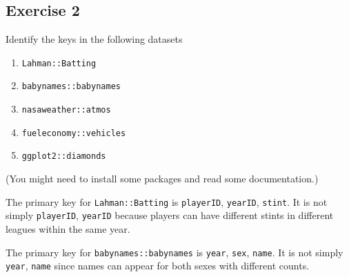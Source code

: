 \documentclass[]{book}
\newenvironment{Shaded}{\begin{snugshade}}{\end{snugshade}}
\newcommand{\CommentTok}[1]{\textcolor[rgb]{0.56,0.35,0.01}{\textit{#1}}}
\newcommand{\DecValTok}[1]{\textcolor[rgb]{0.00,0.00,0.81}{#1}}
\newcommand{\KeywordTok}[1]{\textcolor[rgb]{0.13,0.29,0.53}{\textbf{#1}}}
\newcommand{\NormalTok}[1]{#1}
\newcommand{\OperatorTok}[1]{\textcolor[rgb]{0.81,0.36,0.00}{\textbf{#1}}}
\newcommand{\StringTok}[1]{\textcolor[rgb]{0.31,0.60,0.02}{#1}}
\providecommand{\tightlist}{%
  \setlength{\itemsep}{0pt}\setlength{\parskip}{0pt}}
\theoremstyle{plain}
\theoremstyle{remark}
\theoremstyle{definition}
\theoremstyle{definition}
\theoremstyle{definition}
\theoremstyle{remark}
\begin{document}
\hypertarget{exercise-2-26}{%
\subsection{Exercise 2}\label{exercise-2-26}}

Identify the keys in the following datasets

\begin{enumerate}
\def\labelenumi{\arabic{enumi}.}
\tightlist
\item
  \texttt{Lahman::Batting}
\item
  \texttt{babynames::babynames}
\item
  \texttt{nasaweather::atmos}
\item
  \texttt{fueleconomy::vehicles}
\item
  \texttt{ggplot2::diamonds}
\end{enumerate}

(You might need to install some packages and read some documentation.)

The primary key for \texttt{Lahman::Batting} is \texttt{playerID},
\texttt{yearID}, \texttt{stint}. It is not simply \texttt{playerID},
\texttt{yearID} because players can have different stints in different
leagues within the same year.

\begin{Shaded}
\end{Shaded}

The primary key for \texttt{babynames::babynames} is \texttt{year},
\texttt{sex}, \texttt{name}. It is not simply \texttt{year},
\texttt{name} since names can appear for both sexes with different
counts.

\begin{Shaded}
\end{Shaded}
\end{document}
